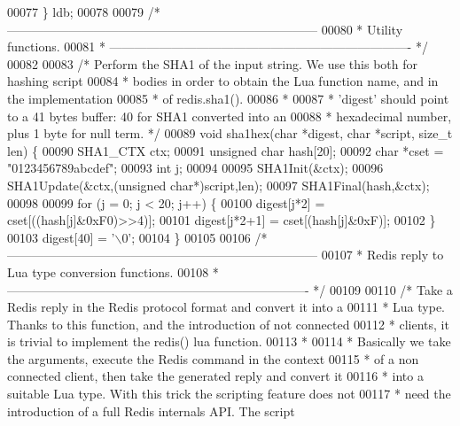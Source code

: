 \begin{DoxyCode}
00077 \} ldb;
00078 
00079 \textcolor{comment}{/* ---------------------------------------------------------------------------}
00080 \textcolor{comment}{ * Utility functions.}
00081 \textcolor{comment}{ * ------------------------------------------------------------------------- */}
00082 
00083 \textcolor{comment}{/* Perform the SHA1 of the input string. We use this both for hashing script}
00084 \textcolor{comment}{ * bodies in order to obtain the Lua function name, and in the implementation}
00085 \textcolor{comment}{ * of redis.sha1().}
00086 \textcolor{comment}{ *}
00087 \textcolor{comment}{ * 'digest' should point to a 41 bytes buffer: 40 for SHA1 converted into an}
00088 \textcolor{comment}{ * hexadecimal number, plus 1 byte for null term. */}
00089 \textcolor{keywordtype}{void} sha1hex(\textcolor{keywordtype}{char} *digest, \textcolor{keywordtype}{char} *script, size\_t len) \{
00090     SHA1\_CTX ctx;
00091     \textcolor{keywordtype}{unsigned} \textcolor{keywordtype}{char} hash[20];
00092     \textcolor{keywordtype}{char} *cset = \textcolor{stringliteral}{"0123456789abcdef"};
00093     \textcolor{keywordtype}{int} j;
00094 
00095     SHA1Init(&ctx);
00096     SHA1Update(&ctx,(\textcolor{keywordtype}{unsigned} \textcolor{keywordtype}{char}*)script,len);
00097     SHA1Final(hash,&ctx);
00098 
00099     \textcolor{keywordflow}{for} (j = 0; j < 20; j++) \{
00100         digest[j*2] = cset[((hash[j]&0xF0)>>4)];
00101         digest[j*2+1] = cset[(hash[j]&0xF)];
00102     \}
00103     digest[40] = \textcolor{stringliteral}{'\(\backslash\)0'};
00104 \}
00105 
00106 \textcolor{comment}{/* ---------------------------------------------------------------------------}
00107 \textcolor{comment}{ * Redis reply to Lua type conversion functions.}
00108 \textcolor{comment}{ * ------------------------------------------------------------------------- */}
00109 
00110 \textcolor{comment}{/* Take a Redis reply in the Redis protocol format and convert it into a}
00111 \textcolor{comment}{ * Lua type. Thanks to this function, and the introduction of not connected}
00112 \textcolor{comment}{ * clients, it is trivial to implement the redis() lua function.}
00113 \textcolor{comment}{ *}
00114 \textcolor{comment}{ * Basically we take the arguments, execute the Redis command in the context}
00115 \textcolor{comment}{ * of a non connected client, then take the generated reply and convert it}
00116 \textcolor{comment}{ * into a suitable Lua type. With this trick the scripting feature does not}
00117 \textcolor{comment}{ * need the introduction of a full Redis internals API. The script}

\end{DoxyCode}
